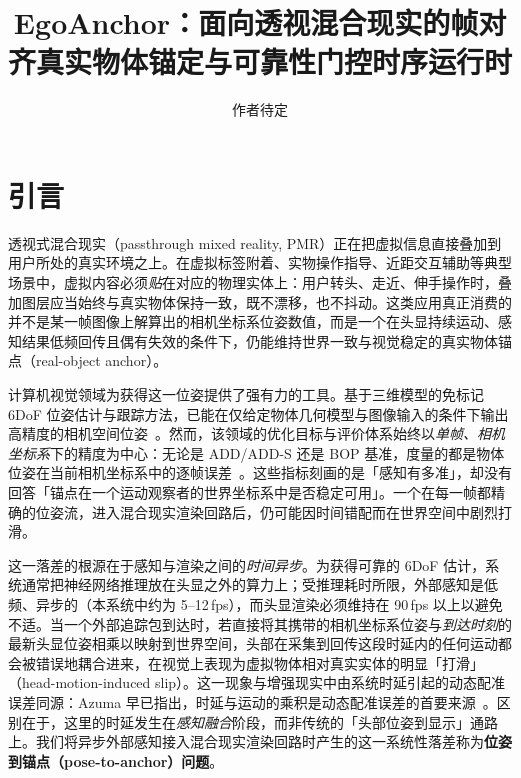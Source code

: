 \documentclass[review]{vgtc}
\title{EgoAnchor：面向透视混合现实的帧对齐真实物体锚定与可靠性门控时序运行时}
\author{作者待定}
\begin{document}
\maketitle

\section{引言}

透视式混合现实（passthrough mixed reality, PMR）正在把虚拟信息直接叠加到用户所处的真实环境之上。在虚拟标签附着、实物操作指导、近距交互辅助等典型场景中，虚拟内容必须\emph{贴}在对应的物理实体上：用户转头、走近、伸手操作时，叠加图层应当始终与真实物体保持一致，既不漂移，也不抖动。这类应用真正消费的并不是某一帧图像上解算出的相机坐标系位姿数值，而是一个在头显持续运动、感知结果低频回传且偶有失效的条件下，仍能维持世界一致与视觉稳定的真实物体锚点（real-object anchor）。

计算机视觉领域为获得这一位姿提供了强有力的工具。基于三维模型的免标记 6DoF 位姿估计与跟踪方法，已能在仅给定物体几何模型与图像输入的条件下输出高精度的相机空间位姿~\cite{foundationpose2023,megapose2022,posecnn2017}。然而，该领域的优化目标与评价体系始终以\emph{单帧、相机坐标系}下的精度为中心：无论是 ADD/ADD-S 还是 BOP 基准，度量的都是物体位姿在当前相机坐标系中的逐帧误差~\cite{hinterstoisser2012add,posecnn2017,hodan2020bop}。这些指标刻画的是「感知有多准」，却没有回答「锚点在一个运动观察者的世界坐标系中是否稳定可用」。一个在每一帧都精确的位姿流，进入混合现实渲染回路后，仍可能因时间错配而在世界空间中剧烈打滑。

这一落差的根源在于感知与渲染之间的\emph{时间异步}。为获得可靠的 6DoF 估计，系统通常把神经网络推理放在头显之外的算力上；受推理耗时所限，外部感知是低频、异步的（本系统中约为 5--12\,fps），而头显渲染必须维持在 90\,fps 以上以避免不适。当一个外部追踪包到达时，若直接将其携带的相机坐标系位姿与\emph{到达时刻}的最新头显位姿相乘以映射到世界空间，头部在采集到回传这段时延内的任何运动都会被错误地耦合进来，在视觉上表现为虚拟物体相对真实实体的明显「打滑」（head-motion-induced slip）。这一现象与增强现实中由系统时延引起的动态配准误差同源：Azuma 早已指出，时延与运动的乘积是动态配准误差的首要来源~\cite{azuma1997survey}。区别在于，这里的时延发生在\emph{感知融合}阶段，而非传统的「头部位姿到显示」通路上。我们将异步外部感知接入混合现实渲染回路时产生的这一系统性落差称为\textbf{位姿到锚点（pose-to-anchor）问题}。
\end{document}
